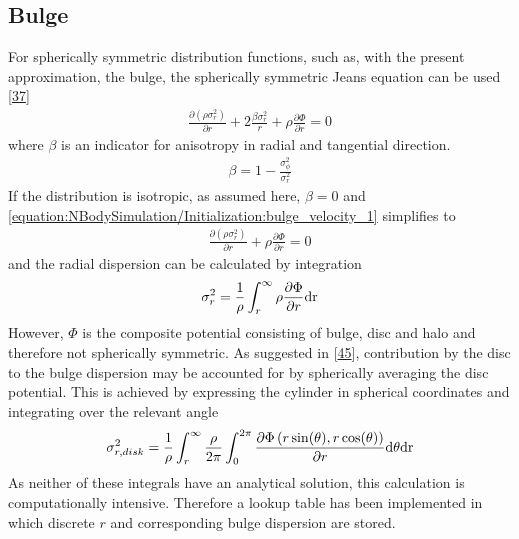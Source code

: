 \documentclass[letterpaper,10pt,english]{sphinxmanual}
\begin{document}
\subsection{Bulge}
\label{\detokenize{NBodySimulation/Initialization:bulge}}
\sphinxAtStartPar
For spherically symmetric distribution functions, such as, with the present approximation, the bulge, the spherically symmetric Jeans equation can be used {[}\hyperlink{cite.NBodySimulation/Appendix:id20}{37}{]}
\begin{equation}\label{equation:NBodySimulation/Initialization:bulge_velocity_1}
\begin{split}\frac{\partial (\rho \sigma_r^2)}{\partial r} + 2\frac{\beta\sigma_r^2}{r} + \rho\frac{\partial \Phi}{\partial r} = 0\end{split}
\end{equation}
\sphinxAtStartPar
where \(\beta\) is an indicator for anisotropy in radial and tangential direction.
\begin{equation*}
\begin{split}\beta = 1 - \frac{\sigma^2_\phi}{\sigma^2_r}\end{split}
\end{equation*}
\sphinxAtStartPar
If the distribution is isotropic, as assumed here, \(\beta=0\) and \eqref{equation:NBodySimulation/Initialization:bulge_velocity_1} simplifies to
\begin{equation*}
\begin{split}\frac{\partial (\rho \sigma_r^2)}{\partial r} +  \rho\frac{\partial \Phi}{\partial r} = 0\end{split}
\end{equation*}
\sphinxAtStartPar
and the radial dispersion can be calculated by integration
\begin{equation*}
\begin{split}\sigma_r^2 = \frac{1}{\rho}\int_{r}^{\infty}\rho \frac{\partial \Phi}{\partial r}\textup{dr}\end{split}
\end{equation*}
\sphinxAtStartPar
However, \(\Phi\) is the composite potential consisting of bulge, disc and halo and therefore not spherically symmetric. As suggested in {[}\hyperlink{cite.NBodySimulation/Appendix:id19}{45}{]}, contribution by the disc to the bulge dispersion may be accounted for by spherically averaging the disc potential.
This is achieved by expressing the cylinder in spherical coordinates and integrating over the relevant angle
\begin{equation*}
\begin{split}\sigma_{r,disk}^2 = \frac{1}{\rho}\int_{r}^{\infty}
\frac{\rho }{2\pi}  \int_0^{2\pi} \frac{\partial \Phi\left ( r\sin(\theta ),r\cos(\theta ) \right )}{\partial r} \textup{d}\theta \textup{dr} \\\end{split}
\end{equation*}
\sphinxAtStartPar
As neither of these integrals have an analytical solution, this calculation is computationally intensive.
Therefore a lookup table has been implemented in which discrete \(r\) and corresponding bulge dispersion are stored.
\end{document}
